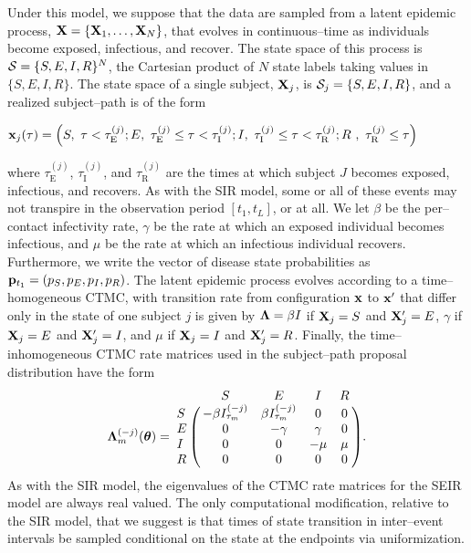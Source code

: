 Under this model, we suppose that the data are sampled from a latent epidemic process, $ \mathbf{X} = \lbrace \mathbf{X}_1,\dots,\mathbf{X}_N\rbrace $, that evolves in continuous--time as individuals become exposed, infectious, and recover. The state space of this process is $ \mathcal{S} = \lbrace S,E,I,R\rbrace^N $, the Cartesian product of $ N $ state labels taking values in $ \lbrace S,E,I,R\rbrace $. The state space of a single subject, $ \mathbf{X}_j $, is $\mathcal{S}_j = \lbrace S, E, I, R\rbrace $, and a realized subject--path is of the form \begin{footnotesize}$ \mathbf{x}_j(\tau) = \left (S,\ \tau < \tau^{(j)}_{\mathrm{E}};E,\  \tau^{(j)}_{\mathrm{E}} \leq \tau < \tau^{(j)}_{\mathrm{I}};I,\ \tau^{(j)}_{\mathrm{I}} \leq \tau < \tau^{(j)}_{\mathrm{R}};R\ ,\ \tau^{(j)}_{\mathrm{R}} \leq \tau
\right ) $\end{footnotesize}
where $ \tau^{(j)}_{\mathrm{E}} $, $ \tau^{(j)}_{\mathrm{I}} $, and $ \tau^{(j)}_{\mathrm{R}} $ are the times at which subject $ J $ becomes exposed, infectious, and recovers. As with the SIR model, some or all of these events may not transpire in the observation period $ [t_1,t_L] $, or at all. We let $ \beta $ be the per--contact infectivity rate, $ \gamma $ be the rate at which an exposed individual becomes infectious, and $ \mu $ be the rate at which an infectious individual recovers. Furthermore, we write the vector of disease state probabilities as $ \mathbf{p}_{t_1} = (p_S,p_E,p_I,p_R) $. The latent epidemic process evolves according to a time--homogeneous CTMC, with transition rate from configuration $ \mathbf{x} $ to $ \mathbf{x}^\prime $ that differ only in the state of one subject $ j $ is given by $ \boldsymbol{\Lambda} = \beta I $ if $ \mathbf{X}_j = S $ and $ \mathbf{X}^\prime_j = E$, $ \gamma $ if $ \mathbf{X}_j = E $ and $ \mathbf{X}^\prime_j = I$, and $ \mu $ if $ \mathbf{X}_j = I $ and $ \mathbf{X}^\prime_j = R$. Finally, the time--inhomogeneous CTMC rate matrices used in the subject--path proposal distribution have the form
\begin{equation} \bLambda_m^{(-j)}(\btheta) = \bordermatrix{ & S & E & I & R \cr
	S & -\beta I_{\tau_m}^{(-j)} & \beta I_{\tau_m}^{(-j)} & 0 & 0 \cr 
	E & 0 & -\gamma & \gamma & 0 \cr
	I & 0 & 0 & -\mu & \mu \cr
	R & 0 & 0 & 0 & 0 }.
\end{equation}
As with the SIR model, the eigenvalues of the CTMC rate matrices for the SEIR model are always real valued. The only computational modification, relative to the SIR model, that we suggest is that times of state transition in inter--event intervals be sampled conditional on the state at the endpoints via uniformization.

